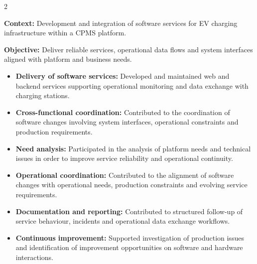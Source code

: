 \documentclass[8pt,a4paper,ragged2e,withhyper]{altacv}
\begin{document}


\makecvheader

\vspace{-0.3cm}


\begin{paracol}{2}


\textbf{Context:} Development and integration of software services for EV charging infrastructure within a CPMS platform.

\textbf{Objective:} Deliver reliable services, operational data flows and system interfaces aligned with platform and business needs.

\begin{itemize}
\item \textbf{Delivery of software services:} Developed and maintained web and backend services supporting operational monitoring and data exchange with charging stations.
\item \textbf{Cross-functional coordination:} Contributed to the coordination of software changes involving system interfaces, operational constraints and production requirements.
\item \textbf{Need analysis:} Participated in the analysis of platform needs and technical issues in order to improve service reliability and operational continuity.
\item \textbf{Operational coordination:} Contributed to the alignment of software changes with operational needs, production constraints and evolving service requirements.
\item \textbf{Documentation and reporting:} Contributed to structured follow-up of service behaviour, incidents and operational data exchange workflows.
\item \textbf{Continuous improvement:} Supported investigation of production issues and identification of improvement opportunities on software and hardware interactions.
\end{itemize}


\end{paracol}
\end{document}
